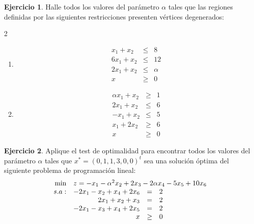 \documentclass[12pt]{article}
\theoremstyle{definition}
\newtheorem{ejer}{Ejercicio}
\newcommand{\bej}{\begin{ejer}}
\newcommand{\fej}{\end{ejer}}
\begin{document}
\bej
 Halle todos los valores del parámetro $\alpha$ tales que las regiones definidas por las siguientes restricciones presenten vértices degenerados:
\begin{multicols}{2}
\begin{enumerate}[label=\alph*)]
    \item \[
        \begin{array}{rcl}
            x_1+x_2 & \leq & 8 \\
            6x_1+x_2 & \leq & 12 \\
            2x_1+x_2 & \leq & \alpha \\
            x & \geq & 0
        \end{array}
        \]
    \item \[
            \begin{array}{rcl}
             \alpha x_1+x_2 & \geq & 1 \\
             2x_1+x_2 & \leq & 6 \\
             -x_1+x_2 & \leq & 5 \\
             x_1+2x_2 & \geq & 6 \\
             x & \geq & 0
            \end{array}
            \]
\end{enumerate}
\end{multicols}
\fej

\bej
Aplique el test de optimalidad para encontrar todos los valores del parámetro $\alpha$ tales que
$x^\ast=(0, 1, 1, 3, 0, 0)^t$ sea una solución óptima del siguiente problema de programación lineal:
\[
    \begin{array}{rrcl}
    \min & \multicolumn{3}{l}{z = -x_1-\alpha^2x_2+2x_3-2\alpha x_4-5x_5+10x_6} \\
    s.a: & -2x_1-x_2+x_4+2x_6 & = & 2 \\
     & 2x_1+x_2+x_3 & = & 2 \\
     & -2x_1-x_3+x_4+2x_5 & = & 2 \\
     & x & \geq & 0
    \end{array}
\]
\fej
\end{document}
